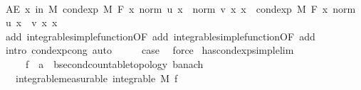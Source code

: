 \begin{isabellebody}
\ \ \isamarkupfalse%
\ \isamarkupfalse%
\ {\isachardoublequoteopen}AE\ x\ in\ M{\isachardot}{\kern0pt}\ cond{\isacharunderscore}{\kern0pt}exp\ M\ F\ {\isacharparenleft}{\kern0pt}{\isasymlambda}x{\isachardot}{\kern0pt}\ norm\ {\isacharparenleft}{\kern0pt}u\ x{\isacharparenright}{\kern0pt}\ {\isacharplus}{\kern0pt}\ norm\ {\isacharparenleft}{\kern0pt}v\ x{\isacharparenright}{\kern0pt}{\isacharparenright}{\kern0pt}\ x\ {\isacharequal}{\kern0pt}\ cond{\isacharunderscore}{\kern0pt}exp\ M\ F\ {\isacharparenleft}{\kern0pt}{\isasymlambda}x{\isachardot}{\kern0pt}\ norm\ {\isacharparenleft}{\kern0pt}u\ x\ {\isacharplus}{\kern0pt}\ v\ x{\isacharparenright}{\kern0pt}{\isacharparenright}{\kern0pt}\ x{\isachardoublequoteclose}\ \isamarkupfalse%
\ add{\isacharparenleft}{\kern0pt}{}{\isacharparenright}{\kern0pt}\ integrable{\isacharunderscore}{\kern0pt}simple{\isacharunderscore}{\kern0pt}function{\isacharbrackleft}{\kern0pt}OF\ add{\isacharparenleft}{\kern0pt}{}{\isacharcomma}{\kern0pt}{}{\isacharparenright}{\kern0pt}{\isacharbrackright}{\kern0pt}\ integrable{\isacharunderscore}{\kern0pt}simple{\isacharunderscore}{\kern0pt}function{\isacharbrackleft}{\kern0pt}OF\ add{\isacharparenleft}{\kern0pt}{}{\isacharcomma}{\kern0pt}{}{\isacharparenright}{\kern0pt}{\isacharbrackright}{\kern0pt}\ \isamarkupfalse%
\ {\isacharparenleft}{\kern0pt}intro\ cond{\isacharunderscore}{\kern0pt}exp{\isacharunderscore}{\kern0pt}cong{\isacharcomma}{\kern0pt}\ auto{\isacharparenright}{\kern0pt}\isanewline
\ \ \isamarkupfalse%
\ \isamarkupfalse%
\ {\isacharquery}{\kern0pt}case\ \isamarkupfalse%
\ force\isanewline
{}\isamarkupfalse%
%
\endisatagproof
{\isafoldproof}%
%
\isadelimproof
\isanewline
%
\endisadelimproof
\isanewline
{}\isamarkupfalse%
\ has{\isacharunderscore}{\kern0pt}cond{\isacharunderscore}{\kern0pt}exp{\isacharunderscore}{\kern0pt}simple{\isacharunderscore}{\kern0pt}lim{\isacharcolon}{\kern0pt}\isanewline
\ \ \ \ \ f\ {\isacharcolon}{\kern0pt}{\isacharcolon}{\kern0pt}\ {\isachardoublequoteopen}{\isacharprime}{\kern0pt}a\ {\isasymRightarrow}\ {\isacharprime}{\kern0pt}b{\isacharcolon}{\kern0pt}{\isacharcolon}{\kern0pt}{\isacharbraceleft}{\kern0pt}second{\isacharunderscore}{\kern0pt}countable{\isacharunderscore}{\kern0pt}topology{\isacharcomma}{\kern0pt}\ banach{\isacharbraceright}{\kern0pt}{\isachardoublequoteclose}\isanewline
\ \ \ integrable{\isacharbrackleft}{\kern0pt}measurable{\isacharbrackright}{\kern0pt}{\isacharcolon}{\kern0pt}\ {\isachardoublequoteopen}integrable\ M\ f{\isachardoublequoteclose}\isanewline

\end{isabellebody}
